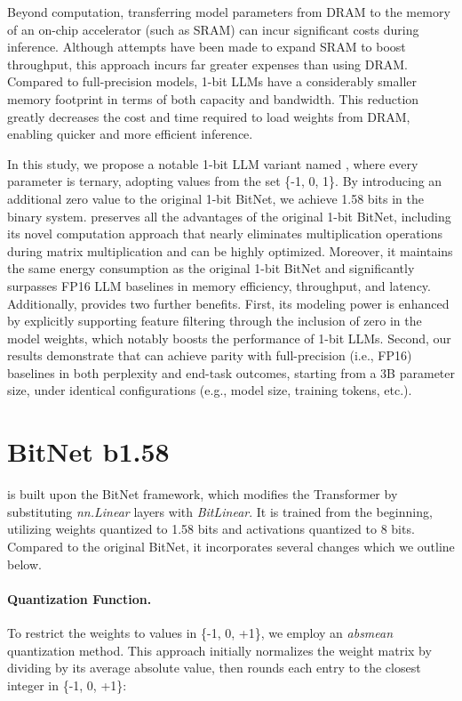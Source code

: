 Beyond computation, transferring model parameters from DRAM to the memory of an on-chip accelerator (such as SRAM) can incur significant costs during inference. Although attempts have been made to expand SRAM to boost throughput, this approach incurs far greater expenses than using DRAM. Compared to full-precision models, 1-bit LLMs have a considerably smaller memory footprint in terms of both capacity and bandwidth. This reduction greatly decreases the cost and time required to load weights from DRAM, enabling quicker and more efficient inference.

In this study, we propose a notable 1-bit LLM variant named \textbf{}, where every parameter is ternary, adopting values from the set \{-1, 0, 1\}. By introducing an additional zero value to the original 1-bit BitNet, we achieve 1.58 bits in the binary system.  preserves all the advantages of the original 1-bit BitNet, including its novel computation approach that nearly eliminates multiplication operations during matrix multiplication and can be highly optimized. Moreover, it maintains the same energy consumption as the original 1-bit BitNet and significantly surpasses FP16 LLM baselines in memory efficiency, throughput, and latency. Additionally,  provides two further benefits. First, its modeling power is enhanced by explicitly supporting feature filtering through the inclusion of zero in the model weights, which notably boosts the performance of 1-bit LLMs. Second, our results demonstrate that  can achieve parity with full-precision (i.e., FP16) baselines in both perplexity and end-task outcomes, starting from a 3B parameter size, under identical configurations (e.g., model size, training tokens, etc.).

\section{BitNet b1.58}

 is built upon the BitNet framework, which modifies the Transformer by substituting \emph{nn.Linear} layers with \emph{BitLinear}. It is trained from the beginning, utilizing weights quantized to 1.58 bits and activations quantized to 8 bits. Compared to the original BitNet, it incorporates several changes which we outline below.

\paragraph{Quantization Function.} To restrict the weights to values in \{-1, 0, +1\}, we employ an \emph{absmean} quantization method. This approach initially normalizes the weight matrix by dividing by its average absolute value, then rounds each entry to the closest integer in \{-1, 0, +1\}:

